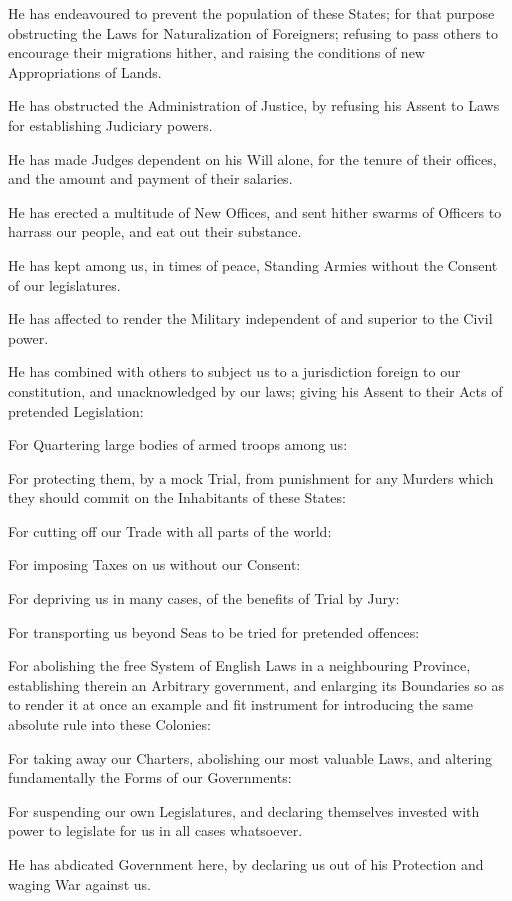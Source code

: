 \documentclass[11pt,a4paper]{article}
\begin{document}
He has endeavoured to prevent the population of these States; for that purpose obstructing the Laws for Naturalization of Foreigners; refusing to pass others to encourage their migrations hither, and raising the conditions of new Appropriations of Lands.

He has obstructed the Administration of Justice, by refusing his Assent to Laws for establishing Judiciary powers.

He has made Judges dependent on his Will alone, for the tenure of their offices, and the amount and payment of their salaries.

He has erected a multitude of New Offices, and sent hither swarms of Officers to harrass our people, and eat out their substance.

He has kept among us, in times of peace, Standing Armies without the Consent of our legislatures.

He has affected to render the Military independent of and superior to the Civil power.

He has combined with others to subject us to a jurisdiction foreign to our constitution, and unacknowledged by our laws; giving his Assent to their Acts of pretended Legislation:

For Quartering large bodies of armed troops among us:

For protecting them, by a mock Trial, from punishment for any Murders which they should commit on the Inhabitants of these States:

For cutting off our Trade with all parts of the world:

For imposing Taxes on us without our Consent:

For depriving us in many cases, of the benefits of Trial by Jury:

For transporting us beyond Seas to be tried for pretended offences:

For abolishing the free System of English Laws in a neighbouring Province, establishing therein an Arbitrary government, and enlarging its Boundaries so as to render it at once an example and fit instrument for introducing the same absolute rule into these Colonies:

For taking away our Charters, abolishing our most valuable Laws, and altering fundamentally the Forms of our Governments:

For suspending our own Legislatures, and declaring themselves invested with power to legislate for us in all cases whatsoever.

He has abdicated Government here, by declaring us out of his Protection and waging War against us.
\end{document}

